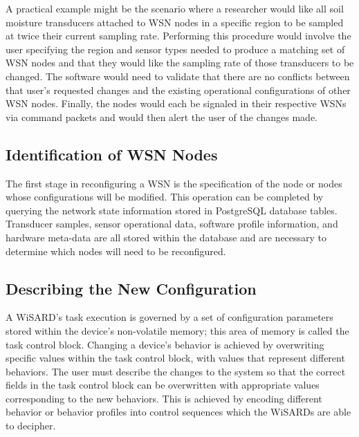 A practical example might be the scenario where a researcher would like all soil moisture transducers attached to WSN nodes in a specific region to be sampled at twice their current sampling rate. Performing this procedure would involve the user specifying the region and sensor types needed to produce a matching set of WSN nodes and that they would like the sampling rate of those transducers to be changed. The software would need to validate that there are no conflicts between that user's requested changes and the existing operational configurations of other WSN nodes. Finally, the nodes would each be signaled in their respective WSNs via command packets and would then alert the user of the changes made.

\subsection{Identification of WSN Nodes}
The first stage in reconfiguring a WSN is the specification of the node or nodes whose configurations will be modified. This operation can be completed by querying the network state information stored in PostgreSQL database tables. Transducer samples, sensor operational data, software profile information, and hardware meta-data are all stored within the database and are necessary to determine which nodes will need to be reconfigured. 

\subsection{Describing the New Configuration}
A WiSARD's task execution is governed by a set of configuration parameters stored within the device's non-volatile memory; this area of memory is called the task control block. Changing a device's behavior is achieved by overwriting specific values within the task control block, with values that represent different behaviors. The user must describe the changes to the system so that the correct fields in the task control block can be overwritten with appropriate values corresponding to the new behaviors. This is achieved by encoding different behavior or behavior profiles into control sequences which the WiSARDs are able to decipher. 

